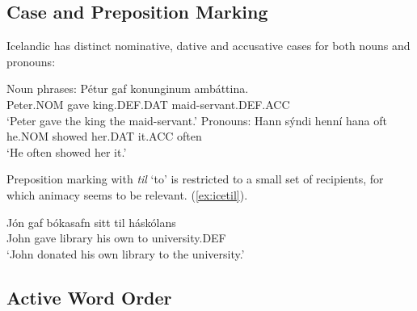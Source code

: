 \subsection{Case and Preposition Marking}
Icelandic has distinct nominative, dative and accusative cases for both nouns and pronouns:
\begin{exe}
\ex Noun phrases:
 \gll Pétur gaf konunginum ambáttina.\\
Peter.NOM gave king.DEF.DAT maid-servant.DEF.ACC\\
\trans `Peter gave the king the maid-servant.'
\ex Pronouns:
\gll Hann sýndi henní hana oft\\
he.NOM showed her.DAT it.ACC often\\
\trans `He often showed her it.'
\end{exe}
Preposition marking with \emph{til} `to' is restricted to a small set of recipients, for which animacy seems to be relevant. (\ref{ex:icetil}).
\begin{exe}
\ex \label{ex:icetil} \cite{Ottosson.1993} 
\begin{xlist} 
\ex \gll Jón gaf bókasafn sitt til háskólans\\
John gave library {his own} to university.DEF\\
\trans `John donated his own library to the university.'
\end{xlist}
\end{exe}
\subsection{Active Word Order}
